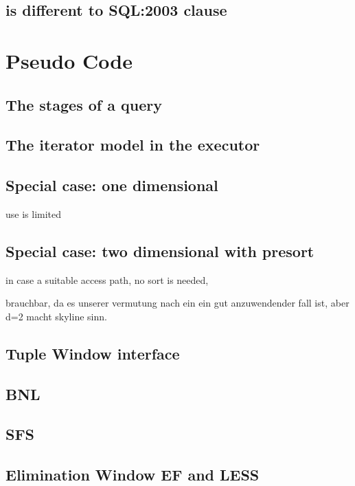 \subsection{ is different to SQL:2003  clause}


\section{Pseudo Code}

\subsection{The stages of a query}

\subsection{The iterator model in the executor}

\subsection{Special case: one dimensional}
use is limited


\subsection{Special case: two dimensional with presort}
in case a suitable access path, no sort is needed,

brauchbar, da es unserer vermutung nach ein ein gut anzuwendender fall ist, aber d=2 macht skyline sinn.


\subsection{Tuple Window interface}

\subsection{BNL}

\subsection{SFS}

\subsection{Elimination Window EF and LESS}

